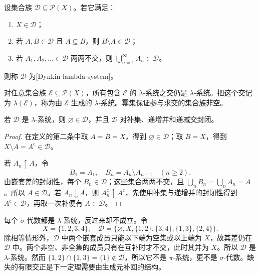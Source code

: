 \begin{definition}
\label{b1:def:lambda-system}
设集合族 \(\mathcal D\subseteq\mathcal P(X)\)。若它满足：
\begin{enumerate}
  \item \label{b1:item:lambda-system-1}
  \(X\in\mathcal D\)；
  \item \label{b1:item:lambda-system-2}
  若 \(A,B\in\mathcal D\) 且 \(A\subseteq B\)，则 \(B\setminus A\in\mathcal D\)；
  \item \label{b1:item:lambda-system-3}
  若 \(A_1,A_2,\ldots\in\mathcal D\) 两两不交，则 \(\bigcup_{n=1}^{\infty}A_n\in\mathcal D\)。
\end{enumerate}
则称 \(\mathcal D\) 为[Dynkin lambda-system]。
\end{definition}

对任意集合族 \(\mathcal E\subseteq\mathcal P(X)\)，所有包含 \(\mathcal E\) 的 \(\lambda\)-系统之交仍是 \(\lambda\)-系统。把这个交记为 \(\lambda(\mathcal E)\)，称为由 \(\mathcal E\) 生成的 \(\lambda\)-系统。幂集保证参与求交的集合族非空。

\begin{proposition}
\label{b1:prop:lambda-basic-closure}
若 \(\mathcal D\) 是 \(\lambda\)-系统，则 \(\varnothing\in\mathcal D\)，并且 \(\mathcal D\) 对补集、递增并和递减交封闭。
\end{proposition}
\begin{proof}
在定义的第二条中取 \(A=B=X\)，得到 \(\varnothing\in\mathcal D\)；取 \(B=X\)，得到 \(X\setminus A=A^{\mathrm c}\in\mathcal D\)。

若 \(A_n\uparrow A\)，令
\[
B_1=A_1,
\quad
B_n=A_n\setminus A_{n-1}\quad(n\geq2).
\]
由嵌套差的封闭性，每个 \(B_n\in\mathcal D\)；这些集合两两不交，且 \(\bigcup_nB_n=\bigcup_nA_n=A\)。所以 \(A\in\mathcal D\)。若 \(A_n\downarrow A\)，则 \(A_n^{\mathrm c}\uparrow A^{\mathrm c}\)，先使用补集与递增并的封闭性得到 \(A^{\mathrm c}\in\mathcal D\)，再取一次补便有 \(A\in\mathcal D\)。
\end{proof}

每个 \(\sigma\)-代数都是 \(\lambda\)-系统，反过来却不成立。令
\[
X=\{1,2,3,4\},
\quad
\mathcal D
=\bigl\{\varnothing,X,\{1,2\},\{3,4\},\{1,3\},\{2,4\}\bigr\}.
\]
除相等情形外，\(\mathcal D\) 中两个嵌套成员只能以下端为空集或以上端为 \(X\)，故其差仍在 \(\mathcal D\) 中。两个非空、非全集的成员只有在互补时才不交，此时其并为 \(X\)。所以 \(\mathcal D\) 是 \(\lambda\)-系统。然而
\(
\{1,2\}\cap\{1,3\}=\{1\}\notin\mathcal D
\)，所以它不是 \(\pi\)-系统，更不是 \(\sigma\)-代数。缺失的有限交正是下一定理需要由生成元补回的结构。

